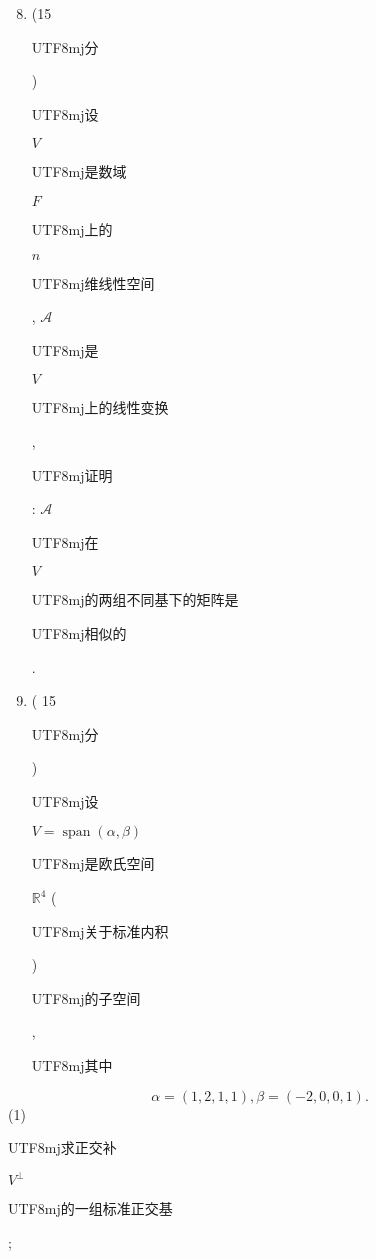 \documentclass[10pt]{article}
\begin{document}
\begin{enumerate}
  \setcounter{enumi}{7}
  \item (15 \begin{CJK}{UTF8}{mj}分\end{CJK}) \begin{CJK}{UTF8}{mj}设\end{CJK} $V$ \begin{CJK}{UTF8}{mj}是数域\end{CJK} $F$ \begin{CJK}{UTF8}{mj}上的\end{CJK} $n$ \begin{CJK}{UTF8}{mj}维线性空间\end{CJK}, $\mathcal{A}$ \begin{CJK}{UTF8}{mj}是\end{CJK} $V$ \begin{CJK}{UTF8}{mj}上的线性变换\end{CJK}, \begin{CJK}{UTF8}{mj}证明\end{CJK}: $\mathcal{A}$ \begin{CJK}{UTF8}{mj}在\end{CJK} $V$ \begin{CJK}{UTF8}{mj}的两组不同基下的矩阵是\end{CJK} \begin{CJK}{UTF8}{mj}相似的\end{CJK}.

  \item ( 15 \begin{CJK}{UTF8}{mj}分\end{CJK}) \begin{CJK}{UTF8}{mj}设\end{CJK} $V=\operatorname{span}(\alpha, \beta)$ \begin{CJK}{UTF8}{mj}是欧氏空间\end{CJK} $\mathbb{R}^{4}$ (\begin{CJK}{UTF8}{mj}关于标准内积\end{CJK})\begin{CJK}{UTF8}{mj}的子空间\end{CJK}, \begin{CJK}{UTF8}{mj}其中\end{CJK}

\end{enumerate}
$$
\alpha=(1,2,1,1), \beta=(-2,0,0,1) .
$$
(1) \begin{CJK}{UTF8}{mj}求正交补\end{CJK} $V^{\perp}$ \begin{CJK}{UTF8}{mj}的一组标准正交基\end{CJK};
\end{document}
